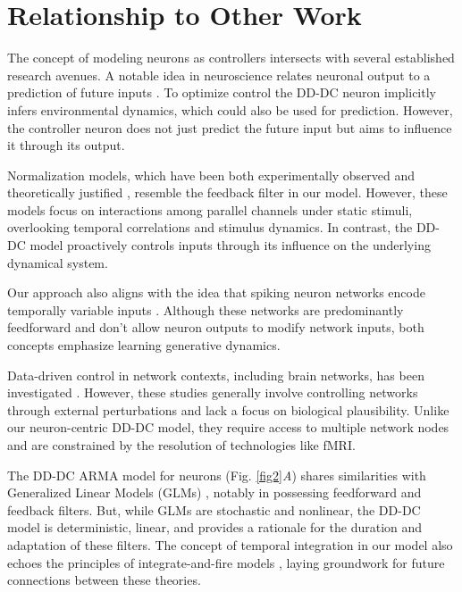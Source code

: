 \documentclass[9pt,twocolumn,twoside]{pnas-new}
\begin{document}
\section*{Relationship to Other Work}

The concept of modeling neurons as controllers intersects with several established research avenues. A notable idea in neuroscience relates neuronal output to a prediction of future inputs \citep{srinivasan1982predictive,tishby2000information,rao1999predictive,chalk2018toward}. To optimize control the DD-DC neuron implicitly infers environmental dynamics, which could also be used for prediction. However, the controller neuron does not just predict the future input but aims to influence it through its output.

Normalization models, which have been both experimentally observed and theoretically justified \citep{wainwright200210,carandini2012normalization,brenner2000adaptive}, resemble the feedback filter in our model. However, these models focus on interactions among parallel channels under static stimuli, overlooking temporal correlations and stimulus dynamics. In contrast, the DD-DC model proactively controls inputs through its influence on the underlying dynamical system.

Our approach also aligns with the idea that spiking neuron networks encode temporally variable inputs \citep{boerlin2013predictive}. Although these networks are predominantly feedforward and don't allow neuron outputs to modify network inputs, both concepts emphasize learning generative dynamics.

Data-driven control in network contexts, including brain networks, has been investigated \citep{baggio2021data}. However, these studies generally involve controlling networks through external perturbations and lack a focus on biological plausibility. Unlike our neuron-centric DD-DC model, they require access to multiple network nodes and are constrained by the resolution of technologies like fMRI.

The DD-DC ARMA model for neurons (Fig. \ref{fig2}\textit{A}) shares similarities with Generalized Linear Models (GLMs) \citep{pillow2008spatio}, notably in possessing feedforward and feedback filters. But, while GLMs are stochastic and nonlinear, the DD-DC model is deterministic, linear, and provides a rationale for the duration and adaptation of these filters. The concept of temporal integration in our model also echoes the principles of integrate-and-fire models \citep{lapicque1907recherches}, laying groundwork for future connections between these theories.
\end{document}
